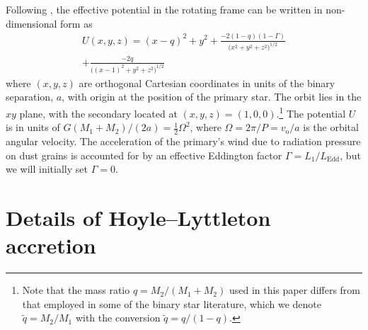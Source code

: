 \documentclass[useAMS, usenatbib, a4paper]{mnras}
\newcommand\orb{\ensuremath{_{\mathrm{o}}}}
\newcommand\qq{\ensuremath{\tilde{q}}}
\begin{document}
Following \citet{Seidov:2004a},
the effective potential in the rotating frame
can be written in non-dimensional form as
\begin{multline}
  \label{eq:effective-potential}
  U(x, y, z) = (x - q)^2 + y^2               %
  + \frac{-2 (1 - q) (1 - \Gamma)}{\bigl(x^2 + y^2 + z^2\bigr)^{1/2}} \\ %
  + \frac{-2 q}{\bigl((x-1)^2 + y^2 + z^2\bigr)^{1/2}}   %
\end{multline}
where \((x, y, z)\) are orthogonal Cartesian coordinates
in units of the binary separation, \(a\),
with origin at the position of the primary star. The orbit lies in the \(xy\) plane,
with the secondary located at \((x, y, z) = (1, 0, 0)\).\footnote{%
  Note that the mass ratio \(q = M_2 / (M_1 + M_2)\) used in this paper differs from that
  employed in some of the binary star literature, which we denote \(\qq = M_2 / M_1\)
  with the conversion \(\qq = q / (1 - q)\).
}
The potential \(U\) is in units of \(G (M_1 + M_2) / (2 a) = \frac12 \Omega^2\), where \(\Omega = 2 \pi / P = v\orb / a\) is the orbital angular velocity.
The acceleration of the primary's wind due to radiation pressure on dust grains is
accounted for by an effective Eddington factor \(\Gamma = L_1 / L_{\mathrm{Edd}}\), but we will initially set \(\Gamma = 0\). 




\appendix

\section{Details of Hoyle--Lyttleton accretion}
\label{sec:deta-hoyle-lyttl}



\bsp	%
\label{lastpage}
\end{document}
